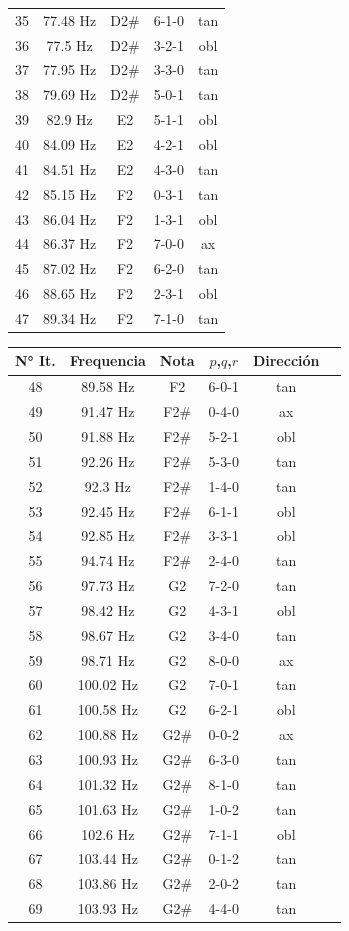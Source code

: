 \begin{table}[H]
\begin{tabular}{|c|c|c|c|c|}
35&77.48 Hz&D2\#&6-1-0&tan\\
36&77.5 Hz&D2\#&3-2-1&obl\\
37&77.95 Hz&D2\#&3-3-0&tan\\
38&79.69 Hz&D2\#&5-0-1&tan\\
39&82.9 Hz&E2&5-1-1&obl\\
40&84.09 Hz&E2&4-2-1&obl\\
41&84.51 Hz&E2&4-3-0&tan\\
42&85.15 Hz&F2&0-3-1&tan\\
43&86.04 Hz&F2&1-3-1&obl\\
44&86.37 Hz&F2&7-0-0&ax\\
45&87.02 Hz&F2&6-2-0&tan\\
46&88.65 Hz&F2&2-3-1&obl\\
47&89.34 Hz&F2&7-1-0&tan\\
\hline
    \end{tabular}
    \quad
    \begin{tabular}{|c|c|c|c|c|c|}
    \hline
N° It. & Frequencia & Nota & $p$,$q$,$r$ & Dirección \\
\hline \hline
48&89.58 Hz&F2&6-0-1&tan\\
49&91.47 Hz&F2\#&0-4-0&ax\\
50&91.88 Hz&F2\#&5-2-1&obl\\
51&92.26 Hz&F2\#&5-3-0&tan\\
52&92.3 Hz&F2\#&1-4-0&tan\\
53&92.45 Hz&F2\#&6-1-1&obl\\
54&92.85 Hz&F2\#&3-3-1&obl\\
55&94.74 Hz&F2\#&2-4-0&tan\\
56&97.73 Hz&G2&7-2-0&tan\\
57&98.42 Hz&G2&4-3-1&obl\\
58&98.67 Hz&G2&3-4-0&tan\\
59&98.71 Hz&G2&8-0-0&ax\\
60&100.02 Hz&G2&7-0-1&tan\\
61&100.58 Hz&G2&6-2-1&obl\\
62&100.88 Hz&G2\#&0-0-2&ax\\
63&100.93 Hz&G2\#&6-3-0&tan\\
64&101.32 Hz&G2\#&8-1-0&tan\\
65&101.63 Hz&G2\#&1-0-2&tan\\
66&102.6 Hz&G2\#&7-1-1&obl\\
67&103.44 Hz&G2\#&0-1-2&tan\\
68&103.86 Hz&G2\#&2-0-2&tan\\
69&103.93 Hz&G2\#&4-4-0&tan\\

\end{tabular}
\end{table}
